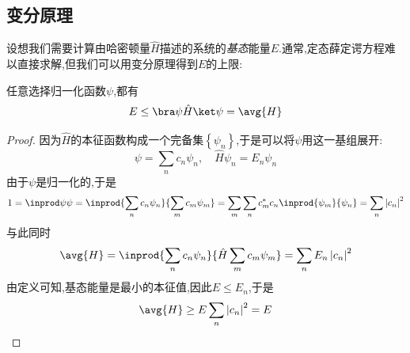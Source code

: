 \documentclass{ctexbook}
\begin{document}
\subsection{变分原理}
设想我们需要计算由哈密顿量$\hat{H}$描述的系统的\textit{基态}能量$E$.通常,定态薛定谔方程难以直接求解,但我们可以用变分原理得到$E$的上限:
\begin{theorem}[变分原理]
    任意选择归一化函数$\psi$,都有
    \[E\leq\bra\psi\hat{H}\ket\psi=\avg{H}\]
\end{theorem}
\begin{proof}
    因为$\hat{H}$的本征函数构成一个完备集$\left\{\psi_n\right\}$,于是可以将$\psi$用这一基组展开:
    \[\psi=\sum_{n}c_n\psi_n,\quad\hat{H}\psi_n=E_n\psi_n\]
    由于$\psi$是归一化的,于是
    \[1=\inprod\psi\psi=\inprod{\sum_{n}c_n\psi_n}{\sum_{m}c_m\psi_m}=\sum_{m}\sum_{n}c_m^\ast c_n\inprod{\psi_m}{\psi_n}=\sum_{n}\left|c_n\right|^2\]
    与此同时
    \[\avg{H}=\inprod{\sum_{n}c_n\psi_n}{\hat{H}\sum_{m}c_m\psi_m}=\sum_{n}E_n\left|c_n\right|^2\]
    由定义可知,基态能量是最小的本征值,因此$E\leq E_n$,于是
    \[\avg{H}\geq E\sum_{n}\left|c_n\right|^2=E\]
\end{proof}
\end{document}
